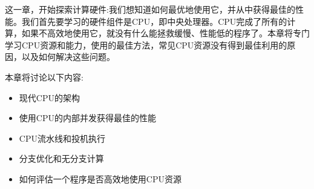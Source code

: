这一章，开始探索计算硬件:我们想知道如何最优地使用它，并从中获得最佳的性能。我们首先要学习的硬件组件是CPU，即中央处理器。CPU完成了所有的计算，如果不高效地使用它，就没有什么能拯救缓慢、性能低的程序了。本章将专门学习CPU资源和能力，使用的最佳方法，常见CPU资源没有得到最佳利用的原因，以及如何解决这些问题。

本章将讨论以下内容:

\begin{itemize}
\item 现代CPU的架构
\item 使用CPU的内部并发获得最佳的性能
\item CPU流水线和投机执行
\item 分支优化和无分支计算
\item 如何评估一个程序是否高效地使用CPU资源
\end{itemize}
